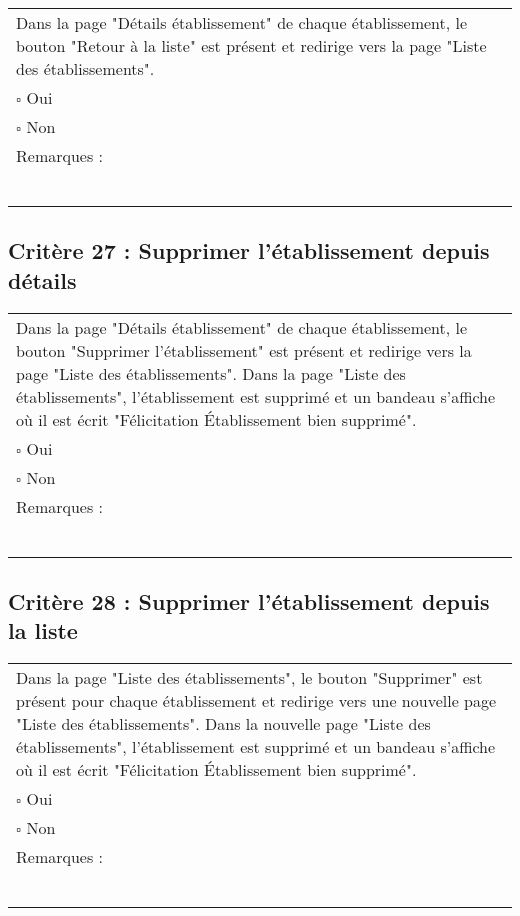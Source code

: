 	\begin{center}
    	 		\begin{tabular}[h]{|p{}|}
			\hline
				Dans la page "Détails établissement" de chaque établissement, le bouton "Retour à la liste" est présent et redirige vers la page "Liste des établissements".\\
				$\square$ Oui  \\ $\square$ Non \\\hline Remarques : \\ ~\\
			 \\\hline
     		\end{tabular}
  		\end{center}	
  		
  		
  		\subsection*{Critère 27 : Supprimer l'établissement depuis détails}
	
	\begin{center}
    	 		\begin{tabular}[h]{|p{}|}
			\hline
				Dans la page "Détails établissement" de chaque établissement, le bouton "Supprimer l'établissement" est présent et redirige vers la page "Liste des établissements". Dans la page "Liste des établissements", l'établissement est supprimé et un bandeau s'affiche où il est écrit "Félicitation Établissement bien supprimé".\\
				$\square$ Oui  \\ $\square$ Non \\\hline Remarques : \\ ~\\
			 \\\hline
     		\end{tabular}
  		\end{center}
  		
  		
  		
  			\subsection*{Critère 28 : Supprimer l'établissement depuis la liste}
	
	\begin{center}
    	 		\begin{tabular}[h]{|p{}|}
			\hline
				Dans la page "Liste des établissements", le bouton "Supprimer" est présent pour chaque établissement et redirige vers une nouvelle page "Liste des établissements". Dans la nouvelle page "Liste des établissements", l'établissement est supprimé et un bandeau s'affiche où il est écrit "Félicitation Établissement bien supprimé".\\
				$\square$ Oui  \\ $\square$ Non \\\hline Remarques : \\ ~\\
			 \\\hline
     		\end{tabular}
  		\end{center}


